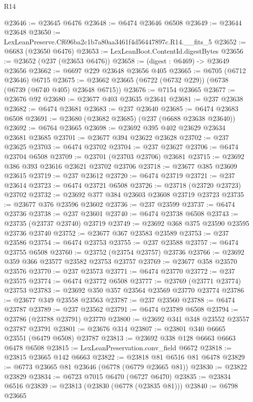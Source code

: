 \begin{lexlean}{R14}
\begin{coremodule}
@23646 := @23645 @6476
@23648 := @6474 @23646 @6508
@23649 := @23644 @23648
@23650 := LexLeanPreserve.Cf696ba2c1b7a80aa3461f4d56447897c.R14.__fits_5
@23652 := @6683 (@23650 @6476)
@23653 := LexLeanBoot.ContentId.digestBytes
@23656 := @23652 (@237 (@23653 @6476))
@23658 := (digest : @6469) -> @23649 @23656
@23662 := @6697 @229 @23648 @23656 @405
@23665 := @6705 (@6712 @23646) @6715
@23675 := @23662 @23665 (@6722 (@6732 @229)) (@6738 (@6739 (@6740 @405) @23648 @6715))
@23676 := @7154 @23665
@23677 := @23676 @92
@23680 := @23677 @403 @23635 @23641
@23681 := @237 @23638
@23682 := @6474 @23681
@23683 := @237 @23640
@23685 := @6474 @23683 @6508
@23691 := @23680 (@23682 @23685) (@237 (@6688 @23638 @23640))
@23692 := @6764 @23665
@23698 := @23692 @395 @402 @23629 @23634 @23681 @23685
@23701 := @23677 @394 @23622 @23628
@23702 := @237 @23625
@23703 := @6474 @23702
@23704 := @237 @23627
@23706 := @6474 @23704 @6508
@23709 := @23701 (@23703 @23706) @23681
@23715 := @23692 @386 @393 @23616 @23621 @23702 @23706
@23718 := @23677 @385 @23609 @23615
@23719 := @237 @23612
@23720 := @6474 @23719
@23721 := @237 @23614
@23723 := @6474 @23721 @6508
@23726 := @23718 (@23720 @23723) @23702
@23732 := @23692 @377 @384 @23603 @23608 @23719 @23723
@23735 := @23677 @376 @23596 @23602
@23736 := @237 @23599
@23737 := @6474 @23736
@23738 := @237 @23601
@23740 := @6474 @23738 @6508
@23743 := @23735 (@23737 @23740) @23719
@23749 := @23692 @368 @375 @23590 @23595 @23736 @23740
@23752 := @23677 @367 @23583 @23589
@23753 := @237 @23586
@23754 := @6474 @23753
@23755 := @237 @23588
@23757 := @6474 @23755 @6508
@23760 := @23752 (@23754 @23757) @23736
@23766 := @23692 @359 @366 @23577 @23582 @23753 @23757
@23769 := @23677 @358 @23570 @23576
@23770 := @237 @23573
@23771 := @6474 @23770
@23772 := @237 @23575
@23774 := @6474 @23772 @6508
@23777 := @23769 (@23771 @23774) @23753
@23783 := @23692 @350 @357 @23564 @23569 @23770 @23774
@23786 := @23677 @349 @23558 @23563
@23787 := @237 @23560
@23788 := @6474 @23787
@23789 := @237 @23562
@23791 := @6474 @23789 @6508
@23794 := @23786 (@23788 @23791) @23770
@23800 := @23692 @341 @348 @23552 @23557 @23787 @23791
@23801 := @23676 @314
@23807 := @23801 @340 @6665 @23551 (@6479 @6508) @23787
@23813 := @23692 @338 @128 @6663 @6663 @6478 @6508
@23815 := LexLeanPreservation.conv_field @6672
@23818 := @23815 @23665 @142 @6663
@23822 := @23818 @81 @6516 @81 @6478
@23829 := @6773 @23665 @81 @23646 (@6778 (@6779 @23665 @81))
@23830 := @23822 @23829
@23834 := @6723 @7015 @6470 (@6727 @6470)
@23835 := @23834 @6516
@23839 := @23813 (@23830 (@6778 (@23835 @81)))
@23840 := @6798 @23665

\end{coremodule}
\end{lexlean}
